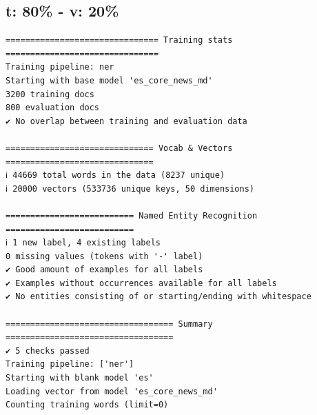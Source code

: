 \documentclass[12pt,a4paper,]{scrartcl}
\begin{document}
\hypertarget{t-80---v-20}{%
\subsection{t: 80\% - v: 20\%}\label{t-80---v-20}}

\begin{verbatim}
=============================== Training stats ===============================
Training pipeline: ner
Starting with base model 'es_core_news_md'
3200 training docs
800 evaluation docs
✔ No overlap between training and evaluation data

============================== Vocab & Vectors ==============================
ℹ 44669 total words in the data (8237 unique)
ℹ 20000 vectors (533736 unique keys, 50 dimensions)

========================== Named Entity Recognition ==========================
ℹ 1 new label, 4 existing labels
0 missing values (tokens with '-' label)
✔ Good amount of examples for all labels
✔ Examples without occurrences available for all labels
✔ No entities consisting of or starting/ending with whitespace

================================== Summary ==================================
✔ 5 checks passed
Training pipeline: ['ner']
Starting with blank model 'es'
Loading vector from model 'es_core_news_md'
Counting training words (limit=0)
\end{verbatim}
\end{document}
